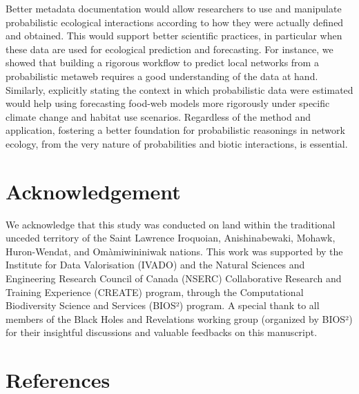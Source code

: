 \documentclass[11pt]{article}
\begin{document}
Better metadata documentation would allow researchers to use and
manipulate probabilistic ecological interactions according to how they
were actually defined and obtained. This would support better scientific
practices, in particular when these data are used for ecological
prediction and forecasting. For instance, we showed that building a
rigorous workflow to predict local networks from a probabilistic metaweb
requires a good understanding of the data at hand. Similarly, explicitly
stating the context in which probabilistic data were estimated would
help using forecasting food-web models more rigorously under specific
climate change and habitat use scenarios. Regardless of the method and
application, fostering a better foundation for probabilistic reasonings
in network ecology, from the very nature of probabilities and biotic
interactions, is essential.

\hypertarget{acknowledgement}{%
\section{Acknowledgement}\label{acknowledgement}}

We acknowledge that this study was conducted on land within the
traditional unceded territory of the Saint Lawrence Iroquoian,
Anishinabewaki, Mohawk, Huron-Wendat, and Omàmiwininiwak nations. This
work was supported by the Institute for Data Valorisation (IVADO) and
the Natural Sciences and Engineering Research Council of Canada (NSERC)
Collaborative Research and Training Experience (CREATE) program, through
the Computational Biodiversity Science and Services (BIOS²) program. A
special thank to all members of the Black Holes and Revelations working
group (organized by BIOS²) for their insightful discussions and valuable
feedbacks on this manuscript.

\hypertarget{references}{%
\section*{References}\label{references}}
\end{document}
